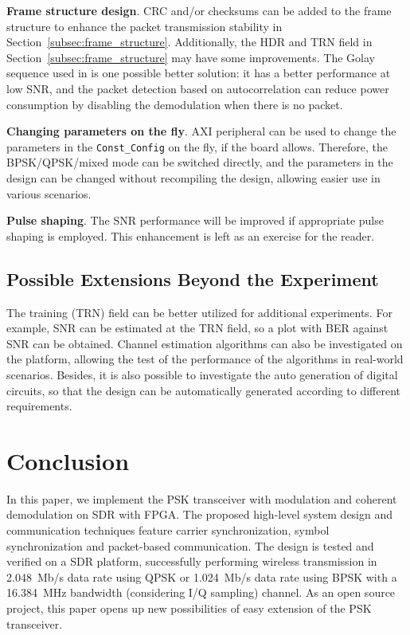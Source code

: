 \documentclass[journal,twoside]{IEEEtran}
\begin{document}
      \textbf{Frame structure design}.
      CRC and/or checksums can be added to the frame structure to enhance the packet transmission stability in Section~\ref{subsec:frame_structure}.
      Additionally,
      the HDR and TRN field in Section~\ref{subsec:frame_structure} may have some improvements.
      The Golay sequence used in \cite{IEEE802.11ad,lacruz2021real,zhao2023automatic} is one possible better solution:
      it has a better performance at low SNR, and the packet detection based on autocorrelation \cite{lacruz2021real}
      can reduce power consumption by disabling the demodulation when there is no packet.

      \textbf{Changing parameters on the fly}.
      AXI peripheral \cite{xilinx:pg127} can be used to change the parameters in the \texttt{Const\_Config} on the fly,
      if the board allows.
      Therefore, the BPSK/QPSK/mixed mode can be switched directly,
      and the parameters in the design can be changed without recompiling the design,
      allowing easier use in various scenarios.

      \textbf{Pulse shaping}.
      The SNR performance will be improved if appropriate pulse shaping is employed.
      This enhancement is left as an exercise for the reader.

    \subsection{Possible Extensions Beyond the Experiment}

      The training (TRN) field can be better utilized for additional experiments.
      For example, SNR can be estimated at the TRN field,
      so a plot with BER against SNR can be obtained.
      Channel estimation algorithms \cite{zhao2023ompl,you2023beam} can also be investigated on the platform,
      allowing the test of the performance of the algorithms in real-world scenarios.
      Besides, it is also possible to investigate the auto generation \cite{zhao2023automatic} of digital circuits,
      so that the design can be automatically generated according to different requirements.

  \section{Conclusion}

    In this paper,
    we implement the PSK transceiver with modulation and coherent demodulation on SDR with FPGA.
    The proposed high-level system design and communication techniques
    feature carrier synchronization, symbol synchronization and packet-based communication.
    The design is tested and verified on a SDR platform, successfully performing wireless transmission in \qty{2.048}{Mb/s} data rate using QPSK
    or \qty{1.024}{Mb/s} data rate using BPSK
    with a \qty{16.384}{MHz} bandwidth (considering I/Q sampling) channel.
    As an open source project,
    this paper opens up new possibilities of easy extension of the PSK transceiver.
\end{document}
